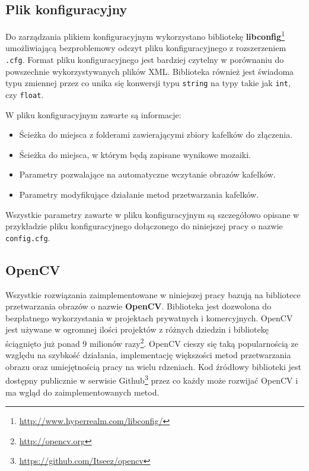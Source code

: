 \subsection{Plik konfiguracyjny}
\label{sec:proponowane_algorytmy:plik_configuracyjny}

Do zarządzania plikiem konfiguracyjnym wykorzystano bibliotekę \textbf{libconfig}\footnote{\url{http://www.hyperrealm.com/libconfig/}} umożliwiającą bezproblemowy odczyt pliku konfiguracyjnego z rozszerzeniem \texttt{.cfg}. Format pliku konfiguracyjnego jest bardziej czytelny w porównaniu do powszechnie wykorzystywanych plików XML. Biblioteka również jest świadoma typu zmiennej przez co unika się konwersji typu \texttt{string} na typy takie jak \texttt{int}, czy \texttt{float}.

W pliku konfiguracyjnym zawarte są informacje:

\begin{itemize}
\item Ścieżka do miejsca z folderami zawierającymi zbiory kafelków do złączenia.
\item Ścieżka do miejsca, w którym będą zapisane wynikowe mozaiki.
\item Parametry pozwalające na automatyczne wczytanie obrazów kafelków.
\item Parametry modyfikujące działanie metod przetwarzania kafelków.
\end{itemize}

Wszystkie parametry zawarte w pliku konfiguracyjnym są szczegółowo opisane w przykładzie pliku konfiguracyjnego dołączonego do niniejszej pracy o nazwie \texttt{config.cfg}.

\subsection{OpenCV}
\label{sec:proponowane_algorytmy:opencv}

Wszystkie rozwiązania zaimplementowane w niniejszej pracy bazują na bibliotece przetwarzania obrazów o nazwie \textbf{OpenCV}. Biblioteka jest dozwolona do bezpłatnego wykorzystania w projektach prywatnych i komercyjnych. OpenCV jest używane w ogromnej ilości projektów z różnych dziedzin i bibliotekę ściągnięto już ponad 9 milionów razy\footnote{\url{http://opencv.org}}. OpenCV cieszy się taką popularnością ze względu na szybkość działania, implementację większości metod przetwarzania obrazu oraz umiejętnością pracy na wielu rdzeniach. Kod źródłowy biblioteki jest dostępny publicznie w serwisie Github\footnote{\url{https://github.com/Itseez/opencv}} przez co każdy może rozwijać OpenCV i ma wgląd do zaimplementowanych metod.

